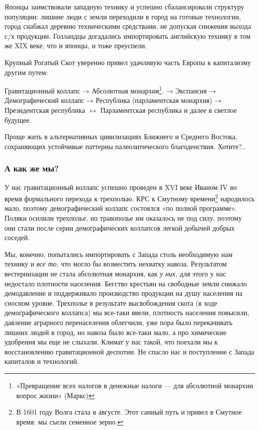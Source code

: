 Японцы заимствовали западную технику и успешно сбалансировали структуру популяции: лишние люди
с земли переходили в город на готовые технологии, город снабжал деревню техническими средствами, не допуская снижения
выхода с/х продукции. Голландцы догадались импортировать английскую технику в том же XIX 
веке, что и японцы, и тоже преуспели.


Крупный Рогатый Скот уверенно привел удачливую часть Европы к капитализму другим путем:


Гравитационный коллапс → Абсолютная монархия\footnote{«Превращение всех налогов в денежные налоги — для
абсолютной монархии вопрос жизни» (Маркс)}. → Экспансия → Демографический коллапс → Республика (парламентская
монархия) → Президентская республика $\leftrightarrow $ Парламентская республика и далее в светлое будущее.

Проще жить в альтернативных цивилизациях Ближнего и Среднего Востока, сохраняющих устойчивые паттерны палеолитического
благоденствия. Хотите?..

\subsubsection[А как же мы? ]{А как же мы? }

У нас гравитационный коллапс успешно проведен в \foreignlanguage{english}{XVI} веке Иваном \foreignlanguage{english}{IV}
во время формального перехода к трехполью. КРС к Смутному времени\footnote{В 1601 году Волга стала в
августе. Этот санный путь и привел в Смутное время: мы съели семенное зерно.} народилось мало, поэтому
демографический коллапс состоялся «по полной программе». Поляки осилили трехполье, но травополье им оказалось не под
силу, поэтому они стали после серии демографических коллапсов легкой добычей добрых соседей.


Мы, конечно, попытались импортировать с Запада столь необходимую нам технику и \textit{все то}, что могло бы возместить
нехватку навоза. Результатом вестернизации не стала абсолютная монархия, как \textit{у них,} для этого у нас недостало
плотности населения. Бегство крестьян на свободные земли снижало демодавление и поддерживало производство продукции на
душу населения на сносном уровне. Трехполье в результате высвобождения скота (в ходе демографического коллапса) мы
все-таки ввели, плотность населения повысили, давление аграрного перенаселения облегчили, уже пора было перекачивать
лишних людей в город, но навоза было все-таки мало, а про химические удобрения мы еще не слыхали. Климат у нас такой,
что поехали мы к восстановлению гравитационной деспотии. Не спасло нас и поступление с Запада капиталов и технологий.


